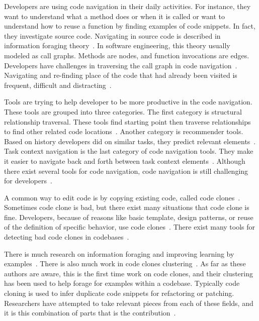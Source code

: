 \documentclass[conference]{IEEEtran}
\begin{document}
Developers are using code navigation in their daily activities. For instance, they want to understand what a method does or when it is called or want to understand how to reuse a function by finding examples of code snippets. In fact, they investigate source code. Navigating in source code is described in information foraging theory~\cite{pirolli1999informationforaging}. In software engineering, this theory usually modeled as call graphs. Methods are nodes, and function invocations are edges. Developers have challenges in traversing the call graph in code navigation~\cite{albusays2017interviews}. Navigating and re-finding place of the code that had already been visited is frequent, difficult and distracting~\cite{ko2005eliciting,deline2005towards}.\par 

Tools are trying to help developer to be more productive in the code navigation. These tools are grouped into three categories. The first category is structural relationship traversal. These tools find starting point then traverse relationships to find other related code locations~\cite{karrer2011stacksplorer,augustine2015field,latoza2011visualizing}. Another category is recommender tools. Based on history developers did on similar tasks, they predict relevant elements~\cite{zimmermann2005mining,deline2005easing}. Task context navigation is the last category of code navigation tools. They make it easier to navigate back and forth between task context elements~\cite{ko2006exploratory}. Although there exist several tools for code navigation, code navigation is still challenging for developers~\cite{albusays2017interviews}. 

A common way to edit code is by copying existing code, called code clones~\cite{codeCloneDetection2019}. Sometimes code clone is bad, but there exist many situations that code clone is fine. Developers, because of reasons like basic template, design patterns, or reuse of the definition of specific behavior, use code clones~\cite{kim2004ethnographic,kapser2008cloning}. There exist many tools for detecting bad code clones in codebases~\cite{bellon2007comparison}.\par 

There is much research on information foraging and improving learning by examples~\cite{brandt2009two}. There is also much work in code clones clustering~\cite{codeCloneDetection2019}. As far as these authors are aware, this is the first time work on code clones, and their clustering has been used to help forage for examples within a codebase. Typically code cloning is used to infer duplicate code snippets for refactoring or patching. Researchers have attempted to take relevant pieces from each of these fields, and it is this combination of parts that is the contribution~\cite{kapser2009toward}.\par
\end{document}
